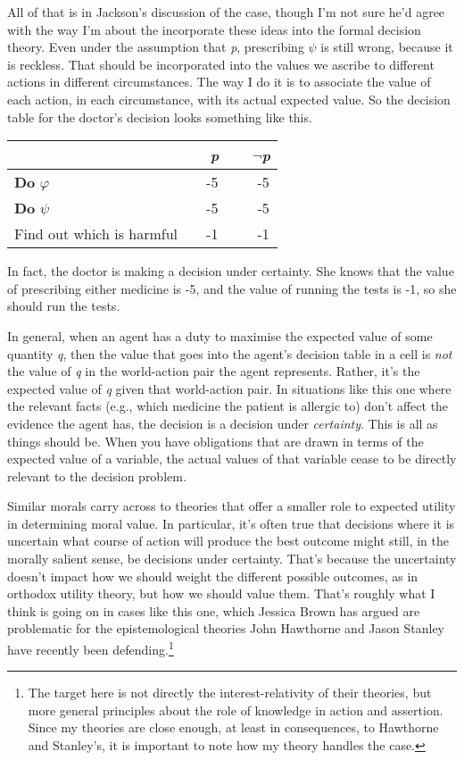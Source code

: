 \documentclass[
  11pt,
  letterpaper,
  DIV=11,
  numbers=noendperiod,
  twoside]{scrartcl}
\begin{document}
All of that is in Jackson's discussion of the case, though I'm not sure
he'd agree with the way I'm about the incorporate these ideas into the
formal decision theory. Even under the assumption that \emph{p},
prescribing \(\psi\) is still wrong, because it is reckless. That should
be incorporated into the values we ascribe to different actions in
different circumstances. The way I do it is to associate the value of
each action, in each circumstance, with its actual expected value. So
the decision table for the doctor's decision looks something like this.

\begin{longtable}[]{@{}lcc@{}}
\toprule\noalign{}
~ & ~\emph{p}~ & ~\(\neg\)\emph{p} \\
\midrule\noalign{}
\endhead
\bottomrule\noalign{}
\endlastfoot
\textbf{Do} \(\varphi\) ~ & ~-5 ~ & ~ -5 \\
\textbf{Do} \(\psi\) ~ & ~-5 ~ & ~ -5 \\
Find out which is harmful~ & ~-1 ~ & ~ -1 \\
\end{longtable}

In fact, the doctor is making a decision under certainty. She knows that
the value of prescribing either medicine is -5, and the value of running
the tests is -1, so she should run the tests.

In general, when an agent has a duty to maximise the expected value of
some quantity \emph{q}, then the value that goes into the agent's
decision table in a cell is \emph{not} the value of \emph{q} in the
world-action pair the agent represents. Rather, it's the expected value
of \emph{q} given that world-action pair. In situations like this one
where the relevant facts (e.g., which medicine the patient is allergic
to) don't affect the evidence the agent has, the decision is a decision
under \emph{certainty}. This is all as things should be. When you have
obligations that are drawn in terms of the expected value of a variable,
the actual values of that variable cease to be directly relevant to the
decision problem.

Similar morals carry across to theories that offer a smaller role to
expected utility in determining moral value. In particular, it's often
true that decisions where it is uncertain what course of action will
produce the best outcome might still, in the morally salient sense, be
decisions under certainty. That's because the uncertainty doesn't impact
how we should weight the different possible outcomes, as in orthodox
utility theory, but how we should value them. That's roughly what I
think is going on in cases like this one, which Jessica Brown has argued
are problematic for the epistemological theories John Hawthorne and
Jason Stanley have recently been defending.\footnote{The target here is
  not directly the interest-relativity of their theories, but more
  general principles about the role of knowledge in action and
  assertion. Since my theories are close enough, at least in
  consequences, to Hawthorne and Stanley's, it is important to note how
  my theory handles the case.}
\end{document}

